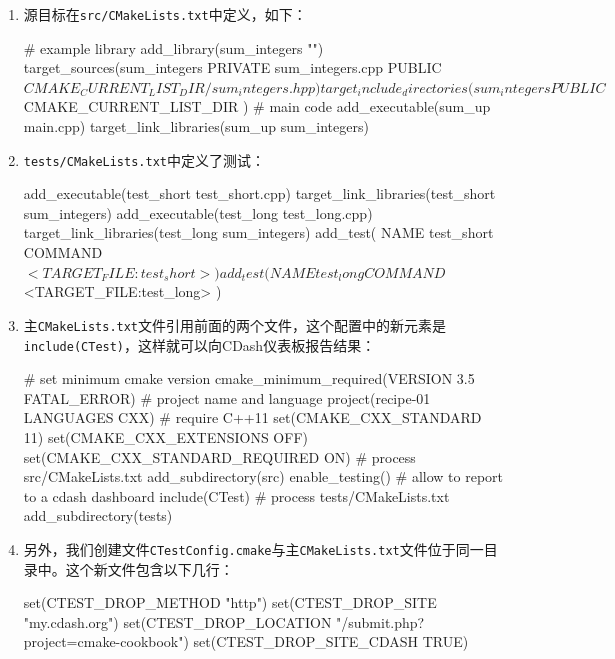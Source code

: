 \begin{enumerate}
\item 源目标在\texttt{src/CMakeLists.txt}中定义，如下：

\begin{codebox}[cmake]
# example library
add_library(sum_integers "")
target_sources(sum_integers
  PRIVATE
    sum_integers.cpp
  PUBLIC
    ${CMAKE_CURRENT_LIST_DIR}/sum_integers.hpp
  )
target_include_directories(sum_integers
  PUBLIC
    ${CMAKE_CURRENT_LIST_DIR}
  )
# main code
add_executable(sum_up main.cpp)
target_link_libraries(sum_up sum_integers)
\end{codebox}

\item \texttt{tests/CMakeLists.txt}中定义了测试：

\begin{codebox}[cmake]
add_executable(test_short test_short.cpp)
target_link_libraries(test_short sum_integers)
add_executable(test_long test_long.cpp)
target_link_libraries(test_long sum_integers)
add_test(
  NAME
    test_short
  COMMAND
    $<TARGET_FILE:test_short>
  )
add_test(
  NAME
    test_long
  COMMAND
    $<TARGET_FILE:test_long>
  )
\end{codebox}

\item 主\texttt{CMakeLists.txt}文件引用前面的两个文件，这个配置中的新元素是\texttt{include(CTest)}，这样就可以向CDash仪表板报告结果：

\begin{codebox}[cmake]
# set minimum cmake version
cmake_minimum_required(VERSION 3.5 FATAL_ERROR)
# project name and language
project(recipe-01 LANGUAGES CXX)
# require C++11
set(CMAKE_CXX_STANDARD 11)
set(CMAKE_CXX_EXTENSIONS OFF)
set(CMAKE_CXX_STANDARD_REQUIRED ON)
# process src/CMakeLists.txt
add_subdirectory(src)
enable_testing()
# allow to report to a cdash dashboard
include(CTest)
# process tests/CMakeLists.txt
add_subdirectory(tests)
\end{codebox}

\item 另外，我们创建文件\texttt{CTestConfig.cmake}与主\texttt{CMakeLists.txt}文件位于同一目录中。这个新文件包含以下几行：

\begin{codebox}[cmake]
set(CTEST_DROP_METHOD "http")
set(CTEST_DROP_SITE "my.cdash.org")
set(CTEST_DROP_LOCATION "/submit.php?project=cmake-cookbook")
set(CTEST_DROP_SITE_CDASH TRUE)
\end{codebox}


\end{enumerate}
